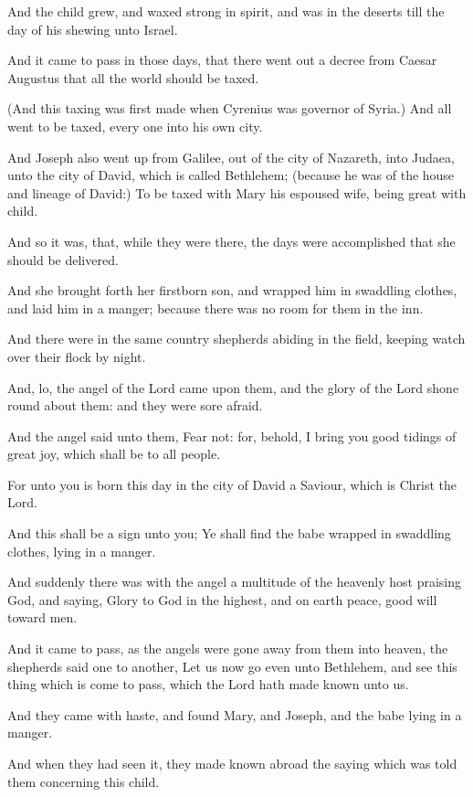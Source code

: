 \Verse And the child grew, and waxed strong in spirit, and was in the deserts till the day of his shewing unto Israel.


\Chapter
\Verse And it came to pass in those days, that there went out a decree from Caesar Augustus that all the world should be taxed.

\Verse (And this taxing was first made when Cyrenius was governor of Syria.)  \Verse And all went to be taxed, every one into his own city.

\Verse And Joseph also went up from Galilee, out of the city of Nazareth, into Judaea, unto the city of David, which is called Bethlehem; (because he was of the house and lineage of David:) \Verse To be taxed with Mary his espoused wife, being great with child.

\Verse And so it was, that, while they were there, the days were accomplished that she should be delivered.

\Verse And she brought forth her firstborn son, and wrapped him in swaddling clothes, and laid him in a manger; because there was no room for them in the inn.

\Verse And there were in the same country shepherds abiding in the field, keeping watch over their flock by night.

\Verse And, lo, the angel of the Lord came upon them, and the glory of the Lord shone round about them: and they were sore afraid.

\Verse And the angel said unto them, Fear not: for, behold, I bring you good tidings of great joy, which shall be to all people.

\Verse For unto you is born this day in the city of David a Saviour, which is Christ the Lord.

\Verse And this shall be a sign unto you; Ye shall find the babe wrapped in swaddling clothes, lying in a manger.

\Verse And suddenly there was with the angel a multitude of the heavenly host praising God, and saying, \Verse Glory to God in the highest, and on earth peace, good will toward men.

\Verse And it came to pass, as the angels were gone away from them into heaven, the shepherds said one to another, Let us now go even unto Bethlehem, and see this thing which is come to pass, which the Lord hath made known unto us.

\Verse And they came with haste, and found Mary, and Joseph, and the babe lying in a manger.

\Verse And when they had seen it, they made known abroad the saying which was told them concerning this child.

